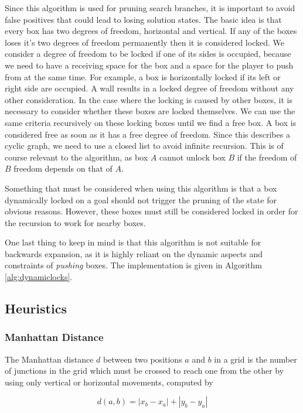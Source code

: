 \documentclass[a4paper,11pt]{article}
\begin{document}
Since this algorithm is used for pruning search branches, it is important to
avoid false positives that could lead to losing solution states. The basic idea
is that every box has two degrees of freedom, horizontal and vertical. If any of
the boxes loses it's two degrees of freedom permanently then it is considered
locked.  We consider a degree of freedom to be locked if one of its sides is
occupied, because we need to have a receiving space for the box and a space for
the player to push from at the same time. For example, a box is horizontally
locked if its left or right side are occupied. A wall results in a locked degree
of freedom without any other consideration. In the case where the locking is
caused by other boxes, it is necessary to consider whether these boxes are
locked themselves. We can use the same criteria recursively on these locking
boxes until we find a free box. A box is considered free as soon as it has a
free degree of freedom. Since this describes a cyclic graph, we need to use a
closed list to avoid infinite recursion. This is of course relevant to the
algorithm, as box $A$ cannot unlock box $B$ if the freedom of $B$ freedom
depends on that of $A$.

Something that must be considered when using this algorithm is that a box
dynamically locked on a goal should not trigger the pruning of the state for
obvious reasons. However, these boxes must still be considered locked in order
for the recursion to work for nearby boxes.

One last thing to keep in mind is that this algorithm is not suitable for
backwards expansion, as it is highly reliant on the dynamic aspects and
constraints of \emph{pushing} boxes. The implementation is given in Algorithm
\ref{alg:dynamiclocks}.


\subsection{Heuristics}

\subsubsection{Manhattan Distance}

The Manhattan distance $d$ between two positions $a$ and $b$ in a grid is the
number of junctions in the grid which must be crossed to reach one from the
other by using only vertical or horizontal movements, computed by

\[ d(a,b) = |x_b - x_a | + |y_b - y_a | \]
\end{document}
